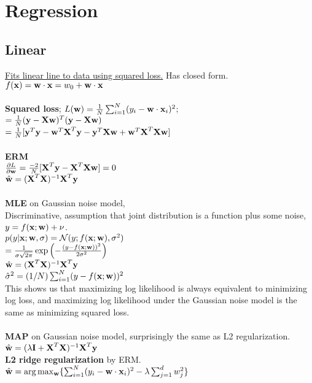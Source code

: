\section{Regression}
\subsection{Linear}
\underline{Fits linear line to data using squared loss.} Has closed form.\\
$f(\x) = \w\cdot \x = w_0 + \w\cdot \x$\\\\
\textbf{Squared loss}; $L(\w) = \frac{1}{N}\sum_{i=1}^{N}(y_i - \w\cdot \x_i)^2$;\\
$= \frac{1}{N}(\y-\X\w)^T(\y-\X\w)$\\
$= \frac{1}{N}[\y^T \y - \w^T \X^T \y - \y^T \X \w + \w^T\X^T\X\w]$\\\\
\textbf{ERM}\\
$\frac{\partial L}{\partial \w} = \frac{-2}{N}[\X^T\y - \X^T\X\w] = 0$\\
$\hat{\w} = (\X^T\X)^{-1}\X^T\y$\\\\
\textbf{MLE} on Gaussian noise model,\\
Discriminative, assumption that joint distribution is a function plus some noise, $y=f(\x;\w) + \nu$.\\
$p(y|\x; \w, \sigma) = \mathcal{N}(y; f(\x;\w),\sigma^2)$\\
$= \frac{1}{\sigma\sqrt{2\pi}}\exp\left(-\frac{(y-f(\x;\w))^2}{2\sigma^2}\right)$\\
$\hat{\w} = (\X^T\X)^{-1}\X^T\y$\\
$\hat{\sigma}^2 = (1/N)\sum_{i=1}^{N}(y-f(\x; \w))^2$\\
This shows us that maximizing log likelihood is always equivalent to minimizing log loss, and maximizing log likelihood under the Gaussian noise model is the same as minimizing squared loss.
\\\\
\textbf{MAP} on Gaussian noise model, surprisingly the same as L2 regularization.\\
$\hat{\w} = (\lambda \textbf{I} + \X^T \X)^{-1}\X^T \y$\\
\textbf{L2 ridge regularization} by ERM.\\
$\hat{\w} = \arg\max_{\w}\{\sum_{i=1}^{N}(y_i - \w\cdot\x_i)^2 - \lambda\sum_{j=1}^{d}w_j^2\}$\\\\
